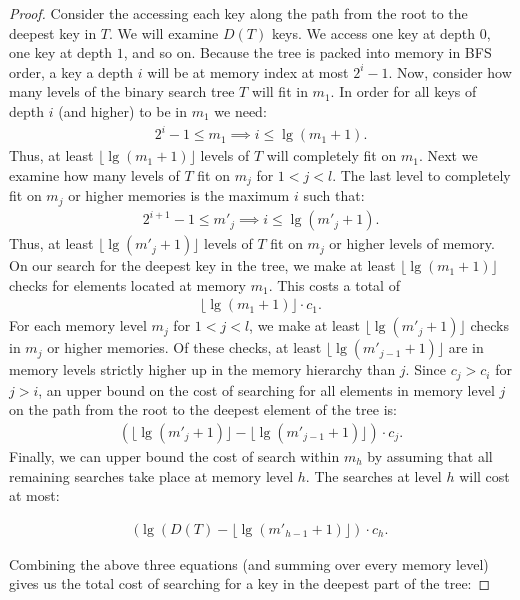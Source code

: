 \documentclass[letterpaper,12pt,titlepage,oneside,final]{book}
\theoremstyle{plain}
\begin{document}
\begin{proof}
Consider the accessing each key along the path from the root to the deepest key in $T$. We will examine $D(T)$ keys. We access one key at depth $0$, one key at depth $1$, and so on. Because the tree is packed into memory in BFS order, a key a depth $i$ will be at memory index at most $2^i-1$. Now, consider how many levels of the binary search tree $T$ will fit in $m_1$. In order for all keys of depth $i$ (and higher) to be in $m_1$ we need:
\begin{align*}
2^i-1 \leq m_1 \implies i \leq \lg(m_1 + 1).
\end{align*}
Thus, at least $\lfloor \lg(m_1 + 1) \rfloor$ levels of $T$ will completely fit on $m_1$. Next we examine how many levels of $T$ fit on $m_j$ for $1 < j < l$. The last level to completely fit on $m_j$ or higher memories is the maximum $i$ such that:
\begin{align*}
2^{i+1}-1 \leq m'_j \implies i \leq \lg(m'_j + 1).
\end{align*}
Thus, at least $\lfloor \lg(m'_j + 1) \rfloor$ levels of $T$ fit on $m_j$ or higher levels of memory.
On our search for the deepest key in the tree, we make at least $\lfloor \lg(m_1 + 1) \rfloor$ checks for elements located at memory $m_1$. This costs a total of
\begin{align*}
\lfloor \lg(m_1 + 1) \rfloor \cdot c_1.
\end{align*}
For each memory level $m_j$ for $1 < j < l$, we make at least $\lfloor \lg(m'_j + 1) \rfloor$ checks in $m_j$ or higher memories. Of these checks, at least $\lfloor \lg(m'_{j-1} + 1) \rfloor$ are in memory levels strictly higher up in the memory hierarchy than $j$. Since $c_j > c_i$ for $j > i$, an upper bound on the cost of searching for all elements in memory level $j$ on the path from the root to the deepest element of the tree is:
\begin{align*}
(\lfloor \lg(m'_j + 1) \rfloor - \lfloor \lg(m'_{j-1} + 1) \rfloor) \cdot c_j.
\end{align*}
Finally, we can upper bound the cost of search within $m_h$ by assuming that all remaining searches take place at memory level $h$. The searches at level $h$ will cost at most:

\begin{align*}
(\lg(D(T) - \lfloor \lg(m'_{h-1}+1) \rfloor)\cdot c_h.
\end{align*}

Combining the above three equations (and summing over every memory level) gives us the total cost of searching for a key in the deepest part of the tree:


\end{proof}
\end{document}
